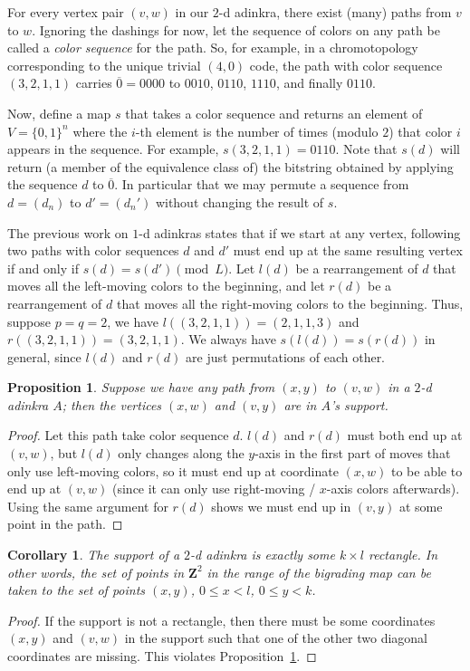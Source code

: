 \documentclass[12pt,twoside,singlespace]{article}
\numberwithin{equation}{section}
\newtheorem{cor}[equation]{Corollary}
\newtheorem{prop}[equation]{Proposition}
\theoremstyle{definition}
\newcommand{\ZZ}{\mathbf{Z}}
\begin{document}
For every vertex pair $(v,w)$ in our $2$-d adinkra, there exist (many) paths from $v$ to $w$. Ignoring the dashings for now, let the sequence of colors on any path be called a \emph{color sequence} for the path. So, for example, in a chromotopology corresponding to the unique trivial $(4,0)$ code, the path with color sequence $(3,2,1,1)$ carries $\overline{0} = 0000$ to $0010$, $0110$, $1110$, and finally $0110$. 

Now, define a map $s$ that takes a color sequence and returns an element of $V = \{0,1\}^n$ where the $i$-th element is the number of times (modulo $2$) that color $i$ appears in the sequence. For example, $s(3,2,1,1) = 0110$. Note that $s(d)$ will return (a member of the equivalence class of) the bitstring obtained by applying the sequence $d$ to $\overline{0}$.  In particular that we may permute a sequence from $d = (d_n)$ to $d' = (d_n')$ without changing the result of $s$. 

The previous work on $1$-d adinkras states that if we start at any vertex, following two paths with color sequences $d$ and $d'$ must end up at the same resulting vertex if and only if $s(d) = s(d') \pmod{L}$. Let $l(d)$ be a rearrangement of $d$ that moves all the left-moving colors to the beginning, and let $r(d)$ be a rearrangement of $d$ that moves all the right-moving colors to the beginning. Thus, suppose $p = q = 2$, we have $l((3,2,1,1)) = (2,1,1,3)$ and $r((3,2,1,1)) = (3,2,1,1)$. We always have $s(l(d)) = s(r(d))$ in general, since $l(d)$ and $r(d)$ are just permutations of each other.

\begin{prop}
\label{prop:rectangle-completion}
Suppose we have any path from $(x,y)$ to $(v,w)$ in a $2$-d adinkra $A$; then the vertices $(x,w)$ and $(v,y)$ are in $A$'s support.
\end{prop}
\begin{proof}
Let this path take color sequence $d$. $l(d)$ and $r(d)$ must both end up at $(v,w)$, but $l(d)$ only changes along the $y$-axis in the first part of moves that only use left-moving colors, so it must end up at coordinate $(x,w)$ to be able to end up at $(v,w)$ (since it can only use right-moving / $x$-axis colors afterwards). Using the same argument for $r(d)$ shows we must end up in $(v,y)$ at some point in the path.
\end{proof}

\begin{cor}
\label{cor:rectangle}
The support of a $2$-d adinkra is exactly some $k \times l$ rectangle. In other words, the set of points in $\ZZ^2$ in the range of the bigrading map can be taken to the set of points $(x,y)$, $0 \leq x < l$, $0 \leq y < k$.
\end{cor}
\begin{proof}
If the support is not a rectangle, then there must be some coordinates $(x,y)$ and $(v,w)$ in the support such that one of the other two diagonal coordinates are missing. This violates Proposition~\ref{prop:rectangle-completion}.
\end{proof}
\end{document}
